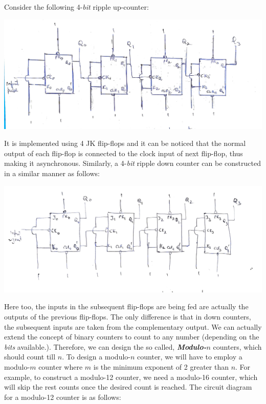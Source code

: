 \par
\noindent
Consider the following 4-\emph{bit} ripple up-counter:
\begin{center}
    \includegraphics[scale = 0.15]{Figures/upcount_1.jpg}
\end{center}
\noindent
It is implemented using 4 JK flip-flops and it can be noticed that the normal output of each flip-flop is connected to the clock input of next flip-flop, thus making it asynchronous. Similarly, a 4-\emph{bit} ripple down counter can be constructed in a similar manner as follows:
\begin{center}
    \includegraphics[scale = 0.15]{Figures/downcount_1.jpg}
\end{center}
\noindent
Here too, the inputs in the subsequent flip-flops are being fed are actually the outputs of the previous flip-flops. The only difference is that in down counters, the subsequent inputs are taken from the complementary output.
\newline
We can actually extend the concept of binary counters to count to any number (depending on the \emph{bits} available.). Therefore, we can design the so called, \textbf{\emph{Modulo-$n$}} counters, which should count till $n$. To design a modulo-$n$ counter, we will have to employ a modulo-$m$ counter where $m$ is the minimum exponent of 2 greater than $n$. For example, to construct a modulo-12 counter, we need a modulo-16 counter, which will skip the rest counts once the desired count is reached. The circuit diagram for a modulo-12 counter is as follows:
